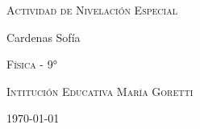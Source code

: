 \documentclass[letterpaper, 12pt, a4paper]{report}
\begin{document}
\begin{titlepage}
\centering

\vspace{0.5cm}
{\scshape\Huge Actividad de Nivelación Especial \par}
\vspace{3cm}
\textbf\large\scshape{\par}
     \vspace{5cm}
     
{\Large Cardenas Sofía\par}
\vspace{10cm}
{\scshape\Large Física - 9° \par}
\vspace{0.5cm}
{\scshape\Large Intitución Educativa María Goretti\par}
\vspace{0.5cm}
{\Large \today \par}
\end{titlepage}

\newpage
\end{document}
